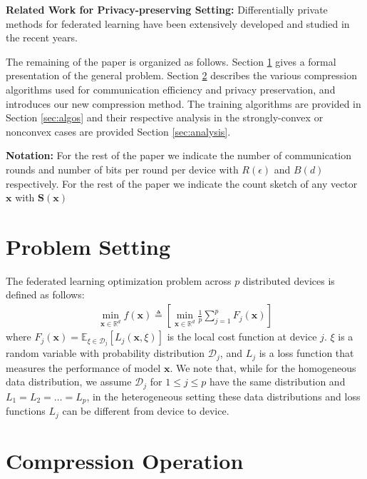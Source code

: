 \documentclass{article}
\begin{document}
\textbf{Related Work for Privacy-preserving Setting:} Differentially private methods for federated learning have been extensively developed and studied in the recent years. 


The remaining of the paper is organized as follows.
Section \ref{sec:problem} gives a formal presentation of the general problem. 
Section \ref{sec:compression} describes the various compression algorithms used for communication efficiency and privacy preservation, and introduces our new compression method.
The training algorithms are provided in Section \ref{sec:algos} and their respective analysis in the strongly-convex or nonconvex cases are provided Section \ref{sec:analysis}.

\textbf{Notation:} For the rest of the paper we indicate the number of communication rounds and number of bits per round per device with $R(\epsilon)$ and $B(d)$ respectively. For the rest of the paper we indicate the count sketch of any vector $\boldsymbol{x}$ with $\mathbf{S}(\boldsymbol{x})$
 
\section{Problem Setting}\label{sec:problem}
The federated learning optimization problem across $p$ distributed devices is defined as follows:
\begin{align}\label{eq:main}
   \min_{\boldsymbol{x}\in \mathbb{R}^{d}} f(\boldsymbol{x})\triangleq \left[\min_{\boldsymbol{x}\in \mathbb{R}^{d}}\frac{1}{p}\sum_{j=1}^{p}F_j(\boldsymbol{x})\right]
\end{align}
where $F_j(\boldsymbol{x})=\mathbb{E}_{\xi\in\mathcal{D}_j}\left[L_j\left(\boldsymbol{x},\xi\right)\right]$ is the local cost function at device $j$.
$\xi$ is a random variable with probability distribution $\mathcal{D}_j$, and $L_j$ is a loss function that measures the performance of model $\boldsymbol{x}$. 
We note that, while for the homogeneous data distribution, we assume $\mathcal{D}_j$ for $1\leq j\leq p$ have the same distribution and $L_1=L_2=\ldots=L_p$, in the heterogeneous setting these data distributions and loss functions $L_j$ can be different from device to device. 

\section{Compression Operation}\label{sec:compression}
\end{document}
